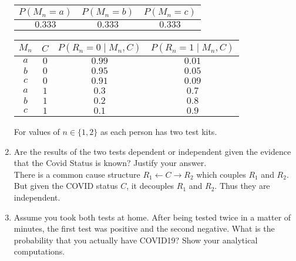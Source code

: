 \begin{enumerate}
        \begin{center}
          \begin{center}
            \bgroup
            \def\arraystretch{1.5}%
            \begin{tabular}{|c|c|c|}
              \hline
              $P(M_n=a)$ & $P(M_n=b)$ & $P(M_n=c)$ \\
              \hline
              $0.333$    & $0.333$    & $0.333$    \\
              \hline
            \end{tabular}
            \egroup
          \end{center}
          \bgroup
          \def\arraystretch{1.5}%
          \begin{tabular}{|cc|c|c|}
            \hline
            $M_n$ & $C$ & $P(R_n=0\mid M_n, C)$ & $P(R_n=1\mid M_n, C)$ \\
            \hline
            $a$   & $0$ & $0.99$                & $0.01$                \\
            \hline
            $b$   & $0$ & $0.95$                & $0.05$                \\
            \hline
            $c$   & $0$ & $0.91$                & $0.09$                \\
            \hline
            $a$   & $1$ & $0.3$                 & $0.7$                 \\
            \hline
            $b$   & $1$ & $0.2$                 & $0.8$                 \\
            \hline
            $c$   & $1$ & $0.1$                 & $0.9$                 \\
            \hline
          \end{tabular}
          \egroup
        \end{center}
        For values of $n \in \{1, 2\}$ as each person has two test kits.
  \item Are the results of the two tests dependent or independent given the evidence that the Covid Status is known? Justify your answer.\\[5pt]
        There is a common cause structure $R_1 \leftarrow C \rightarrow R_2$ which couples $R_1$ and $R_2$. But given the COVID status $C$, it decouples $R_1$ and $R_2$. Thus they are independent.
  \item Assume you took both tests at home. After being tested twice in a matter of minutes, the first test was positive and the second negative. What is the probability that you actually have COVID19? Show your analytical computations.\\[5pt]

\end{enumerate}
